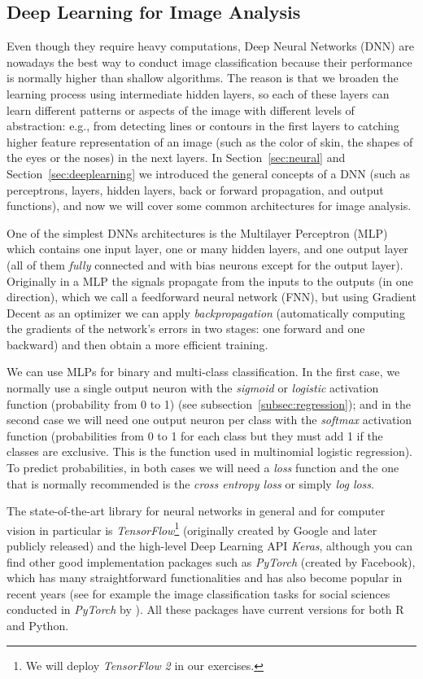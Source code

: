 \subsection{Deep Learning for Image Analysis}
\label{subsec:deep}

Even though they require heavy computations, Deep Neural Networks (DNN) are nowadays the best way to conduct image classification because their performance is normally higher than shallow algorithms. The reason is that we broaden the learning process using intermediate hidden layers, so each of these layers can learn different patterns or aspects of the image with different levels of abstraction: e.g., from detecting lines or contours in the first layers to catching higher feature representation of an image (such as the color of skin, the shapes of the eyes or the noses) in the next layers. In Section~\ref{sec:neural} and Section~\ref{sec:deeplearning} we introduced the general concepts of a DNN (such as perceptrons, layers, hidden layers, back or forward propagation, and output functions), and now we will cover some common architectures for image analysis.

One of the simplest DNNs architectures is the Multilayer Perceptron (MLP) which contains one input layer, one or many hidden layers, and one output layer (all of them \textit{fully} connected and with bias neurons except for the output layer). Originally in a MLP the signals propagate from the inputs to the outputs (in one direction), which we call a feedforward neural network (FNN), but using Gradient Decent as an optimizer we can apply \textit{backpropagation} (automatically computing the gradients of the network's errors in two stages: one forward and one backward) and then obtain a more efficient training.

We can use MLPs for binary and multi-class classification. In the first case, we normally use a single output neuron with the \textit{sigmoid} or \textit{logistic} activation function (probability from 0 to 1) (see subsection~\ref{subsec:regression}); and in the second case we will need one output neuron per class with the \textit{softmax} activation function (probabilities from 0 to 1 for each class but they must add 1 if the classes are exclusive. This is the function used in multinomial logistic regression). To predict probabilities, in both cases we will need a \textit{loss} function and the one that is normally recommended is the \textit{cross entropy loss} or simply \textit{log loss}.

The state-of-the-art library for neural networks in general and for computer vision in particular is \emph{TensorFlow}\footnote{We will deploy \emph{TensorFlow} \textit{2} in our exercises.}  (originally created by Google and later publicly released) and the high-level Deep Learning API \emph{Keras}, although you can find other good implementation packages such as \emph{PyTorch} (created by Facebook), which has many straightforward functionalities and has also become popular in recent years (see for example the image classification tasks for social sciences conducted in \emph{PyTorch} by \citet{williams2020images}). All these packages have current versions for both R and Python.

